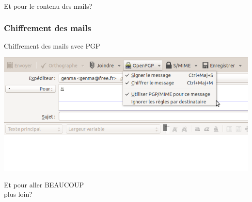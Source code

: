 \documentclass{beamer}
\begin{document}
\begin{frame}
\begin{center}
\Huge{Et pour le contenu des mails?}
\end{center}
\end{frame}

\begin{frame}
\frametitle{Chiffrement des mails}

\begin{block}{Chiffrement des mails avec PGP}
\end{block}
\begin{center}
\includegraphics[scale=0.4] {./images/Thunderbird03.png}
\end{center}
\end{frame}

\begin{frame}
\begin{center}
\Huge{Et pour aller BEAUCOUP \\plus loin?}
\end{center}
\end{frame}
\end{document}
